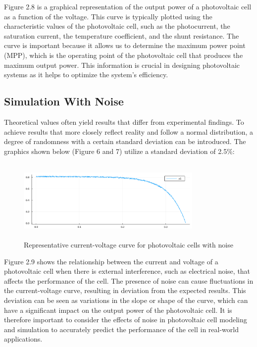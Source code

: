 \documentclass{report}
\begin{document}
\hfill \break
Figure 2.8 is a graphical representation of the output power of a photovoltaic cell as a function of the voltage. This curve is typically plotted using the characteristic values of the photovoltaic cell, such as the photocurrent, the saturation current, the temperature coefficient, and the shunt resistance. The curve is important because it allows us to determine the maximum power point (MPP), which is the operating point of the photovoltaic cell that produces the maximum output power. This information is crucial in designing photovoltaic systems as it helps to optimize the system's efficiency.
\subsection{Simulation With Noise}

Theoretical values often yield results that differ from experimental findings. To achieve results that more closely reflect reality and follow a normal distribution, a degree of randomness with a certain standard deviation can be introduced.
The graphics shown below (Figure 6 and 7) utilize a standard deviation of 2.5\%:
\begin{figure}[h!]
    \centering
    \includegraphics[width=9cm, height=4cm] {test.pdf}
    \caption{Representative current-voltage curve for photovoltaic cells with noise}
    \label{fig:my_label}
\end{figure}

\hfill \break
Figure 2.9 shows the relationship between the current and voltage of a photovoltaic cell when there is external interference, such as electrical noise, that affects the performance of the cell. The presence of noise can cause fluctuations in the current-voltage curve, resulting in deviation from the expected results. This deviation can be seen as variations in the slope or shape of the curve, which can have a significant impact on the output power of the photovoltaic cell. It is therefore important to consider the effects of noise in photovoltaic cell modeling and simulation to accurately predict the performance of the cell in real-world applications.
\end{document}
